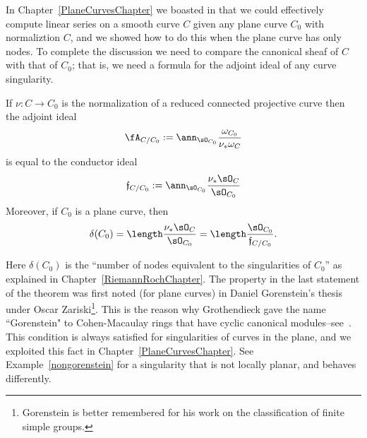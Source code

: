 In Chapter~\ref{PlaneCurvesChapter} we boasted in that we could effectively compute
linear series on a smooth curve $C$ given any plane curve $C_0$ with normaliztion $C$, 
and we showed how to do this when the plane curve has only nodes. To complete the discussion 
we need to compare the canonical sheaf of $C$ with
that of $C_0$; that is, we need a formula for the adjoint ideal of any curve singularity.



\begin{theorem}\label{general adjoint}
If $\nu: C \to C_0$ is the normalization of a reduced connected projective curve then the 
adjoint ideal 
$$
\fA_{C/C_0} :=\ann_{\sO_{C_0}}\frac{\omega_{C_0}}{\nu_* \omega_C}
$$
is equal to the conductor ideal
$$
\mathfrak f_{C/C_0}: = \ann_{\sO_{C_0}}\frac{\nu_* \sO_C}{\sO_{C_0}}	
$$
Moreover, if $C_0$ is a plane curve, then 
$$
\delta(C_0) = \length \frac{\nu_* \sO_C}{\sO_{C_0}} = \length \frac {\sO_{C_0}}{\mathfrak f_{C/C_0}}.
$$
\end{theorem}

Here $\delta(C_0)$ is the ``number of nodes equivalent to the singularities of $C_0$'' as
explained in Chapter~\ref{RiemannRochChapter}.  The property in the last statement of the
theorem  was first noted (for plane curves) in Daniel Gorenstein's thesis under Oscar Zariski\footnote{Gorenstein is better remembered for his work on the classification of finite simple groups.}. This is the
reason why Grothendieck gave the name ``Gorenstein" to Cohen-Macaulay rings that have cyclic canonical 
modules--see~\cite{Bass}. 
This condition is always satisfied for singularities of curves in the plane, and we exploited this fact in Chapter~\ref{PlaneCurvesChapter}.
See Example~\ref{nongorenstein} for a singularity that is not locally planar, and behaves differently.


